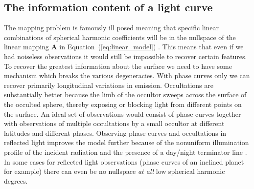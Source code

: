 \documentclass[modern]{aastex62}
\begin{document}
\subsection{The information content of a light curve}
\label{ssec:information_content}
The mapping problem is famously ill posed meaning that specific linear combinations of spherical harmonic coefficients will be in the nullspace of the linear mapping  $\mathbf{A}$ in Equation~(\ref{eq:linear_model}) \citep{luger2021}.
This means that even if we had noiseless observations it would still be impossible to recover certain features.
To recover the greatest information about the surface we need to have some mechanism which breaks the various degeneracies.
With phase curves only we can recover primarily longitudinal variations in emission.
Occultations are substantially better because the limb of the occultor sweeps across the surface of the occulted sphere, thereby exposing or blocking light from different points on the surface.
An ideal set of observations would consist of phase curves together with observations of multiple occultations by a small occultor at different latitudes and different phases.
Observing phase curves and occultations in reflected light improves the model further because of the nonuniform illumination profile of the incident radiation and the presence of a day/night terminator line \citep[][Luger et al. 2021 in prep]{luger2019a}.
In some cases for reflected light observations (phase curves of an inclined planet for example) there can even be no nullspace \emph{at all} low spherical harmonic degrees.
\end{document}
